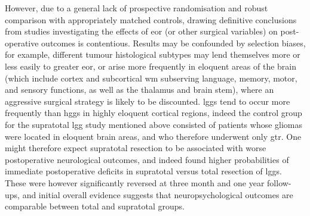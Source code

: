 However, due to a general lack of prospective randomisation and robust comparison with appropriately matched controls, drawing definitive conclusions from studies investigating the effects of \gls{eor} (or other surgical variables) on post-operative outcomes is contentious\autocite{deLeeuw2019,Keles2001}.
Results may be confounded by selection biases, for example, different tumour histological subtypes may lend themselves more or less easily to greater \gls{eor}, or arise more frequently in eloquent areas of the brain (which include cortex and subcortical \gls{wm} subserving language, memory, motor, and sensory functions, as well as the thalamus and brain stem), where an aggressive surgical strategy is likely to be discounted\autocite{deLeeuw2019}.
\Glspl{lgg} tend to occur more frequently than \glspl{hgg} in highly eloquent cortical regions\autocite{Duffau2004}, indeed the control group for the supratotal \gls{lgg} study\autocite{Yordanova2011} mentioned above consisted of patients whose gliomas were located in eloquent brain areas, and who therefore underwent only \gls{gtr}.
One might therefore expect supratotal resection to be associated with worse postoperative neurological outcomes, and indeed \textcite{Rossi2019a} found higher probabilities of immediate postoperative deficits in supratotal versus total resection of \glspl{lgg}.
These were however significantly reversed at three month and one year follow-ups, and initial overall evidence suggests that neuropsychological outcomes are comparable between total and supratotal groups\autocite{Tabor2021}.

